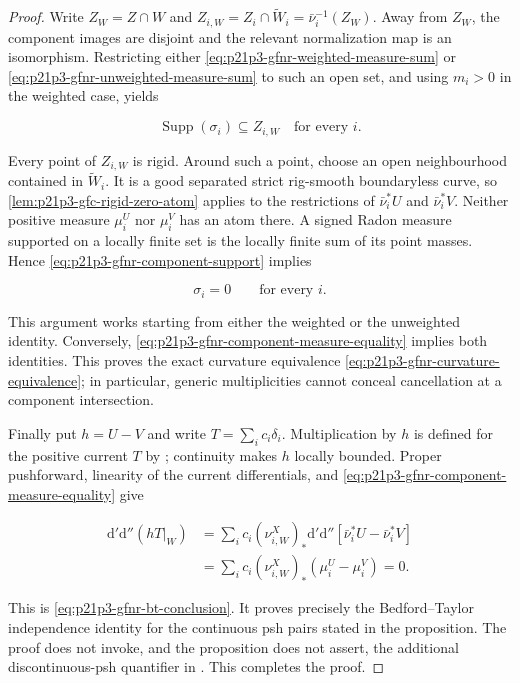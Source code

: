 \begin{proof}
Write \(Z_W=Z\cap W\) and
\(Z_{i,W}=Z_i\cap\widetilde W_i=\bar\nu_i^{-1}(Z_W)\).  Away from \(Z_W\),
the component images are disjoint and the relevant normalization map is
an isomorphism.  Restricting either
\eqref{eq:p21p3-gfnr-weighted-measure-sum} or
\eqref{eq:p21p3-gfnr-unweighted-measure-sum} to such an open set, and
using \(m_i>0\) in the weighted case, yields

\begin{equation}
\label{eq:p21p3-gfnr-component-support}
                       \operatorname{Supp}(\sigma_i)
                       \subseteq Z_{i,W}
                       \quad\text{for every }i.
\end{equation}

Every point of \(Z_{i,W}\) is rigid.  Around such a point, choose an open
neighbourhood contained in \(\widetilde W_i\).  It is a good separated
strict rig-smooth boundaryless curve, so
\cref{lem:p21p3-gfc-rigid-zero-atom} applies to the restrictions of
\(\bar\nu_i^*U\) and \(\bar\nu_i^*V\).  Neither positive measure
\(\mu_i^U\) nor \(\mu_i^V\) has an atom there.  A signed Radon measure
supported on a locally finite set is the locally finite sum of its point
masses.  Hence \eqref{eq:p21p3-gfnr-component-support} implies

\begin{equation}
\label{eq:p21p3-gfnr-component-measure-equality}
                         \sigma_i=0\qquad\text{for every }i.
\end{equation}

This argument works starting from either the weighted or the unweighted
identity.  Conversely,
\eqref{eq:p21p3-gfnr-component-measure-equality} implies both identities.
This proves the exact curvature equivalence
\eqref{eq:p21p3-gfnr-curvature-equivalence}; in particular, generic
multiplicities cannot conceal cancellation at a component intersection.

Finally put \(h=U-V\) and write \(T=\sum_i c_i\delta_i\).  Multiplication
by \(h\) is defined for the positive current \(T\) by
\cite[Example~7.2.12]{CLD25}; continuity makes \(h\) locally bounded.
Proper pushforward, linearity of the current differentials, and
\eqref{eq:p21p3-gfnr-component-measure-equality} give

\begin{align*}
 \mathrm d'\mathrm d''(hT|_W)
 &=\sum_i c_i(\nu_{i,W}^{X})_*
     \mathrm d'\mathrm d''
       [\bar\nu_i^*U-\bar\nu_i^*V]\\
 &=\sum_i c_i(\nu_{i,W}^{X})_*(\mu_i^U-\mu_i^V)=0.
\end{align*}

This is \eqref{eq:p21p3-gfnr-bt-conclusion}.  It proves precisely the
Bedford--Taylor independence identity for the continuous psh pairs stated
in the proposition.  The proof does not invoke, and the proposition does
not assert, the additional discontinuous-psh quantifier in
\cite[Definition~8.6.2]{CLD25}.  This completes the proof.
\end{proof}

